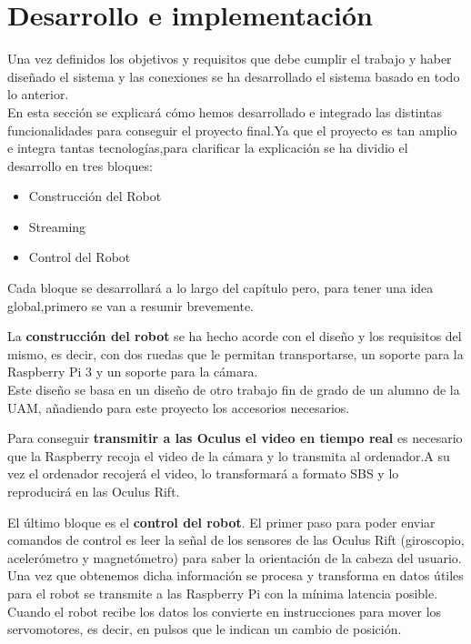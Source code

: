 \documentclass[twoside, 11pt]{epstfg}
\begin{document}
\newpage
\chapter{Desarrollo e implementación}

Una vez definidos los objetivos y requisitos que debe cumplir el trabajo y haber diseñado el sistema y las conexiones se ha desarrollado el sistema basado en todo lo anterior.\\
En esta sección se explicará cómo hemos desarrollado e integrado las distintas funcionalidades para conseguir el proyecto final.Ya que el proyecto es tan amplio e integra tantas tecnologías,para clarificar la explicación se ha dividio el desarrollo en tres bloques:
\begin{itemize}
	\item Construcción del Robot
	\item Streaming 
	\item Control del Robot
\end{itemize}
Cada bloque se desarrollará a lo largo del capítulo pero, para tener una idea global,primero se van a resumir brevemente.

La \textbf{construcción del robot} se ha hecho acorde con el diseño y los requisitos del mismo, es decir, con dos ruedas que le permitan transportarse, un soporte para la Raspberry Pi 3 y un soporte para la cámara.\\
Este diseño se basa en un diseño de otro trabajo fin de grado de un alumno de la UAM, añadiendo para este proyecto los accesorios necesarios.

Para conseguir \textbf{transmitir a las Oculus el video en tiempo real} es necesario que la Raspberry recoja el video de la cámara y lo transmita al ordenador.A su vez el ordenador recojerá el video, lo transformará a formato SBS y lo reproducirá en las Oculus Rift. 

El último bloque es el \textbf{control del robot}. El primer paso para poder enviar comandos de control es leer la señal de los sensores de las Oculus Rift (giroscopio, acelerómetro y magnetómetro) para saber la orientación de la cabeza del usuario.\\
Una vez que obtenemos dicha información se procesa y transforma en datos útiles para el robot se transmite a las Raspberry Pi con la mínima latencia posible.\\
Cuando el robot recibe los datos los convierte en instrucciones para mover los servomotores, es decir, en pulsos que le indican un cambio de posición.
	
\end{document}
